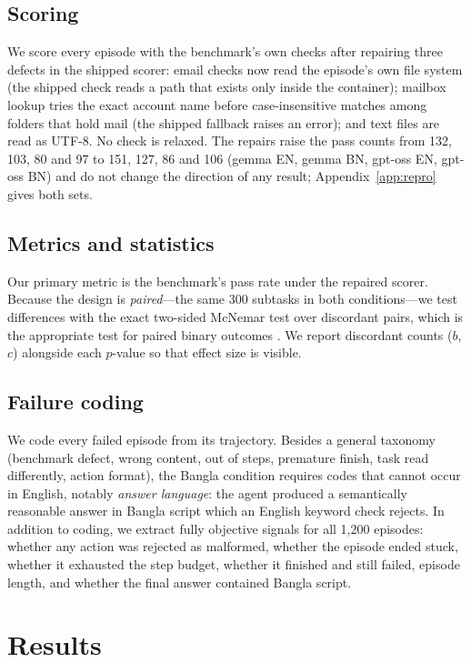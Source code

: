 \documentclass[11pt]{article}
\begin{document}
\subsection{Scoring}
\label{sec:scoring}
We score every episode with the benchmark's own checks after repairing three defects in the
shipped scorer: email checks now read the episode's own file system (the shipped check reads a
path that exists only inside the container); mailbox lookup tries the exact account name before
case-insensitive matches among folders that hold mail (the shipped fallback raises an error);
and text files are read as UTF-8. No check is relaxed. The repairs raise the pass counts from
132, 103, 80 and 97 to 151, 127, 86 and 106 (gemma EN, gemma BN, gpt-oss EN, gpt-oss BN) and do
not change the direction of any result; Appendix~\ref{app:repro} gives both sets.

\subsection{Metrics and statistics}
Our primary metric is the benchmark's pass rate under the repaired scorer. Because the design is \emph{paired}---the
same 300 subtasks in both conditions---we test differences with the exact two-sided McNemar
test over discordant pairs, which is the appropriate test for paired binary outcomes
\citep{mcnemar1947}. We report discordant counts ($b$, $c$) alongside each $p$-value so that
effect size is visible.

\subsection{Failure coding}
We code every failed episode from its trajectory. Besides a general taxonomy (benchmark defect,
wrong content, out of steps, premature finish, task read differently, action format), the Bangla
condition requires codes that cannot occur in English, notably \emph{answer language}: the agent
produced a semantically reasonable answer in Bangla script which an English keyword check
rejects. In addition to coding, we extract fully objective signals for all 1{,}200 episodes:
whether any action was rejected as malformed, whether the episode ended stuck, whether it
exhausted the step budget, whether it finished and still failed, episode length, and whether the
final answer contained Bangla script.

\section{Results}
\end{document}
